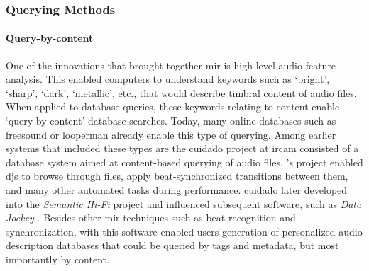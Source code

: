 \subsubsection{Querying Methods}
{
	\paragraph{Query-by-content}
	One of the innovations that brought together \gls{mir} is high-level audio feature analysis. This enabled computers to understand keywords such as `bright', `sharp', `dark', `metallic', etc., that would describe timbral content of audio files. When applied to database queries, these keywords relating to content enable `query-by-content' database searches. Today, many online databases such as \gls{freesound} or \gls{looperman} already enable this type of querying. Among earlier systems that included these types are the \gls{cuidado} project at \gls{ircam} \parencite{DBLP:conf/ismir/VinetHP02, DBLP:conf/icmc/VinetHP02, DBLP:conf/icmc/Vinet05} consisted of a database system aimed at content-based querying of audio files. \citeauthor{DBLP:conf/ismir/VinetHP02}'s project enabled \glspl{dj} to browse through files, apply beat-synchronized transitions between them, and many other automated tasks during performance. \gls{cuidado} later developed into the \textit{Semantic Hi-Fi} project and influenced subsequent software, such as \textit{Data Jockey} \parencite{icmc/bbp2372.2007.117}. Besides other \gls{mir} techniques such as beat recognition and synchronization, with this software \citeauthor{icmc/bbp2372.2007.117} enabled users generation of personalized audio description databases that could be queried by tags and metadata, but most importantly by content.

}
